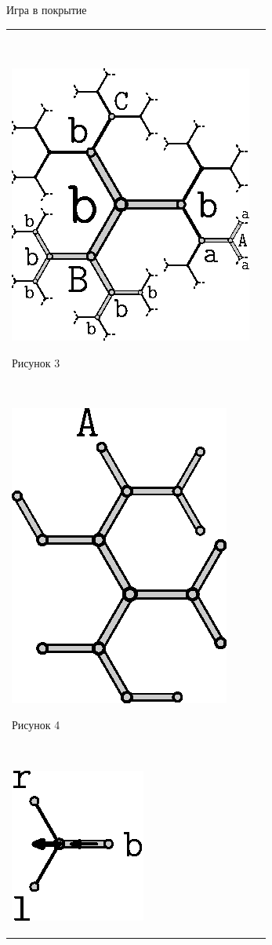 \begin{problem}{Игра в покрытие}
\begin{tabular}{lr}
\begin{minipage}{0.27\thelinewidth}
\begin{center}
~

\includegraphics{covering-game.3.eps}

Рисунок 3

~

\includegraphics{covering-game.4.eps}

Рисунок 4

~

\includegraphics{covering-game.5.eps}


\end{center}
\end{minipage}
\end{tabular}
\end{problem}
